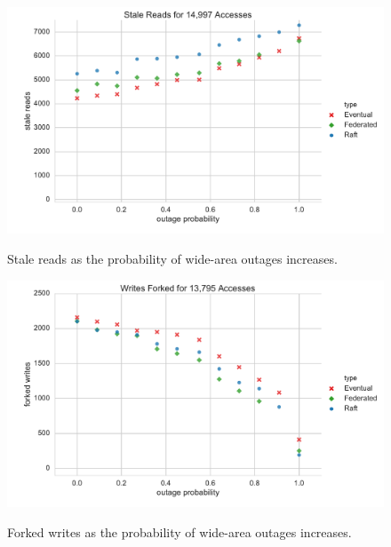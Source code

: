 \begin{figure}
    \begin{center}
        \includegraphics[width=5in]{figures/ch04_outage_stale_reads.pdf}
    \end{center}
    \renewcommand{\baselinestretch}{1}
    \small\normalsize

    \begin{quote}
        \caption[Outages Simulation Stale Reads]{Stale reads as the probability of wide-area outages increases.}
        \label{fig:ch04_outage_stale_reads}
    \end{quote}
\end{figure}
\renewcommand{\baselinestretch}{2}
\small\normalsize

\begin{figure}
    \begin{center}
        \includegraphics[width=5in]{figures/ch04_outage_forked_writes.pdf}
    \end{center}
    \renewcommand{\baselinestretch}{1}
    \small\normalsize

    \begin{quote}
        \caption[Outage Simulation Forked Writes]{Forked writes as the probability of wide-area outages increases.}
        \label{fig:ch04_outage_forked_writes}
    \end{quote}
\end{figure}
\renewcommand{\baselinestretch}{2}
\small\normalsize

